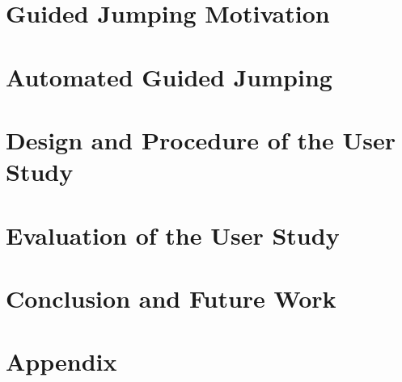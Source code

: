 
\chapter{Guided Jumping Motivation}



\chapter{Automated Guided Jumping}



\chapter{Design and Procedure of the User Study}



\chapter{Evaluation of the User Study}



\chapter{Conclusion and Future Work}



{\footnotesize
{}

}


\appendix
\chapter{Appendix}



